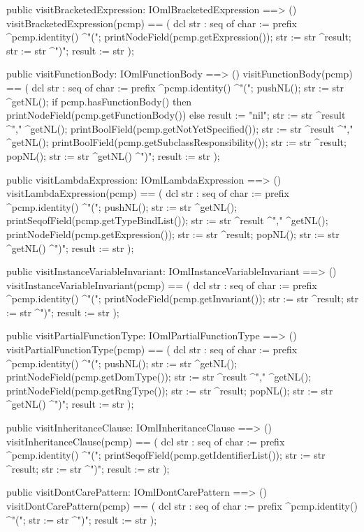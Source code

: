 \begin{vdm_al}
  public visitBracketedExpression: IOmlBracketedExpression ==> ()
  visitBracketedExpression(pcmp) ==
    ( dcl str : seq of char := prefix ^pcmp.identity() ^"(";
      printNodeField(pcmp.getExpression());
      str := str ^result;
      str := str ^")";
      result := str );

  public visitFunctionBody: IOmlFunctionBody ==> ()
  visitFunctionBody(pcmp) ==
    ( dcl str : seq of char := prefix ^pcmp.identity() ^"(";
      pushNL();
      str := str ^getNL();
      if pcmp.hasFunctionBody()
      then printNodeField(pcmp.getFunctionBody())
      else result := "nil";
      str := str ^result ^"," ^getNL();
      printBoolField(pcmp.getNotYetSpecified());
      str := str ^result ^"," ^getNL();
      printBoolField(pcmp.getSubclassResponsibility());
      str := str ^result;
      popNL();
      str := str ^getNL() ^")";
      result := str );

  public visitLambdaExpression: IOmlLambdaExpression ==> ()
  visitLambdaExpression(pcmp) ==
    ( dcl str : seq of char := prefix ^pcmp.identity() ^"(";
      pushNL();
      str := str ^getNL();
      printSeqofField(pcmp.getTypeBindList());
      str := str ^result ^"," ^getNL();
      printNodeField(pcmp.getExpression());
      str := str ^result;
      popNL();
      str := str ^getNL() ^")";
      result := str );

  public visitInstanceVariableInvariant: IOmlInstanceVariableInvariant ==> ()
  visitInstanceVariableInvariant(pcmp) ==
    ( dcl str : seq of char := prefix ^pcmp.identity() ^"(";
      printNodeField(pcmp.getInvariant());
      str := str ^result;
      str := str ^")";
      result := str );

  public visitPartialFunctionType: IOmlPartialFunctionType ==> ()
  visitPartialFunctionType(pcmp) ==
    ( dcl str : seq of char := prefix ^pcmp.identity() ^"(";
      pushNL();
      str := str ^getNL();
      printNodeField(pcmp.getDomType());
      str := str ^result ^"," ^getNL();
      printNodeField(pcmp.getRngType());
      str := str ^result;
      popNL();
      str := str ^getNL() ^")";
      result := str );

  public visitInheritanceClause: IOmlInheritanceClause ==> ()
  visitInheritanceClause(pcmp) ==
    ( dcl str : seq of char := prefix ^pcmp.identity() ^"(";
      printSeqofField(pcmp.getIdentifierList());
      str := str ^result;
      str := str ^")";
      result := str );

  public visitDontCarePattern: IOmlDontCarePattern ==> ()
  visitDontCarePattern(pcmp) ==
    ( dcl str : seq of char := prefix ^pcmp.identity() ^"(";
      str := str ^")";
      result := str );


\end{vdm_al}
